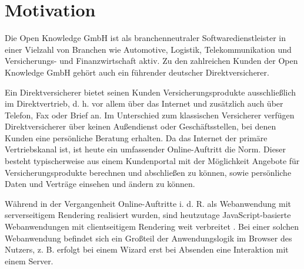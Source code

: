 
\section{Motivation}


Die Open Knowledge GmbH ist als branchenneutraler Softwaredienstleister in einer Vielzahl von Branchen wie Automotive, Logistik, Telekommunikation und Versicherungs- und Finanzwirtschaft aktiv. Zu den zahlreichen Kunden der Open Knowledge GmbH gehört auch ein führender deutscher Direktversicherer. 

Ein Direktversicherer bietet seinen Kunden Versicherungsprodukte ausschließlich im Direktvertrieb, d. h. vor allem über das Internet und zusätzlich auch über Telefon, Fax oder Brief an. Im Unterschied zum klassischen Versicherer verfügen Direktversicherer über keinen Außendienst oder Geschäftsstellen, bei denen Kunden eine persönliche Beratung erhalten. Da das Internet der primäre Vertriebskanal ist, ist heute ein umfassender Online-Auftritt die Norm. Dieser besteht typischerweise aus einem Kundenportal mit der Möglichkeit Angebote für Versicherungsprodukte berechnen und abschließen zu können, sowie persönliche Daten und Verträge einsehen und ändern zu können.


Während in der Vergangenheit Online-Auftritte i. d. R. als Webanwendung mit serverseitigem Rendering realisiert wurden, sind heutzutage JavaScript-basierte Webanwendungen mit clientseitigem Rendering weit verbreitet \cite{ShiftToClientSideWebApplications}. Bei einer solchen Webanwendung befindet sich ein Großteil der Anwendungslogik im Browser des Nutzers, z. B. erfolgt bei einem Wizard erst bei Absenden eine Interaktion mit einem Server.

